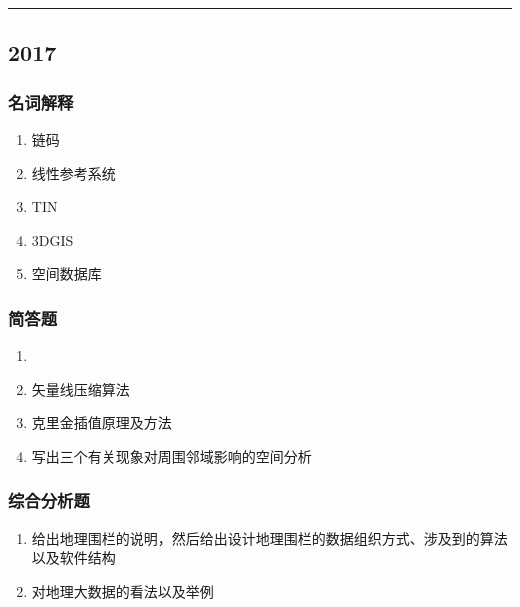 \documentclass[]{article}
\begin{document}
\begin{center}\rule{0.5\linewidth}{\linethickness}\end{center}

\hypertarget{header-n490}{%
\subsection{2017}\label{header-n490}}

\hypertarget{header-n491}{%
\subsubsection{名词解释}\label{header-n491}}

\begin{enumerate}
\def\labelenumi{\arabic{enumi}.}
\item
  链码
\item
  线性参考系统
\item
  TIN
\item
  3DGIS
\item
  空间数据库
\end{enumerate}

\hypertarget{header-n503}{%
\subsubsection{简答题}\label{header-n503}}

\begin{enumerate}
\def\labelenumi{\arabic{enumi}.}
\item
  📄
\item
  矢量线压缩算法
\item
  克里金插值原理及方法
\item
  写出三个有关现象对周围邻域影响的空间分析
\end{enumerate}

\hypertarget{header-n513}{%
\subsubsection{综合分析题}\label{header-n513}}

\begin{enumerate}
\def\labelenumi{\arabic{enumi}.}
\item
  给出地理围栏的说明，然后给出设计地理围栏的数据组织方式、涉及到的算法以及软件结构
\item
  对地理大数据的看法以及举例
\end{enumerate}
\end{document}
